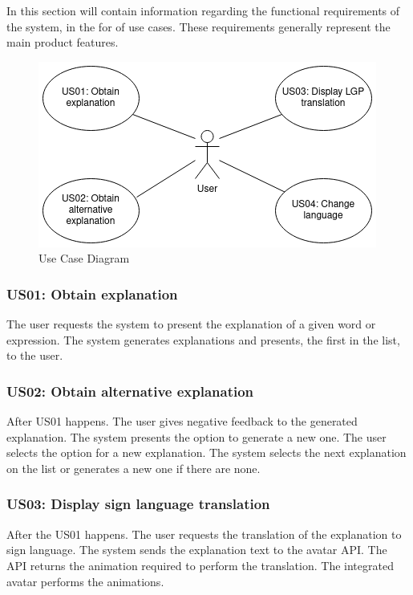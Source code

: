 In this section will contain information regarding the functional requirements of the system, in the for of use cases.
These requirements generally represent the main product features.

\begin{figure}[H]
\centering
\includegraphics[scale=0.65]{ch3/assets/usecasediagram.png}
\caption[Use Case Diagram]{Use Case Diagram}
\label{fig:ucDiagram}
\end{figure}

\subsubsection{US01: Obtain explanation}

The user requests the system to present the explanation of a given word or expression.
The system generates explanations and presents, the first in the list, to the user.

\subsubsection{US02: Obtain alternative explanation}

After US01 happens.
The user gives negative feedback to the generated explanation.
The system presents the option to generate a new one.
The user selects the option for a new explanation.
The system selects the next explanation on the list or generates a new one if there are none.

\subsubsection{US03: Display sign language translation}

After the US01 happens.
The user requests the translation of the explanation to sign language.
The system sends the explanation text to the avatar API.
The API returns the animation required to perform the translation.
The integrated avatar performs the animations.

